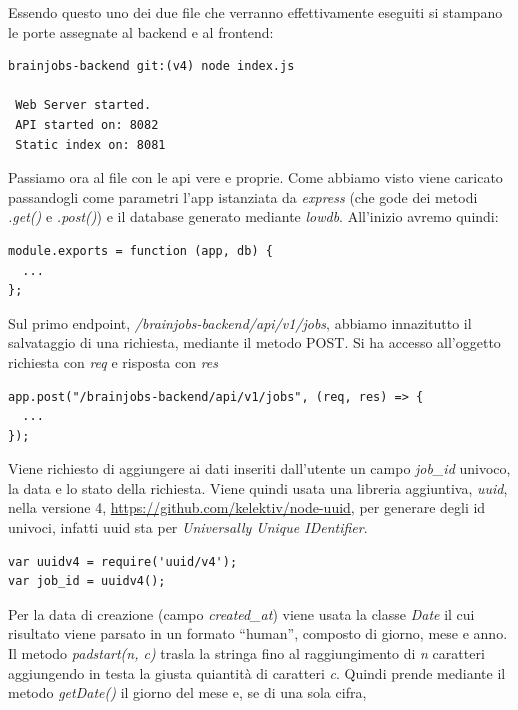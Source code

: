 \documentclass[a4paper,12pt, oneside]{book}
\begin{document}
\newpage
Essendo questo uno dei due file che verranno effettivamente eseguiti si stampano le porte assegnate al backend e al frontend:
\begin{shaded}
\begin{verbatim}
brainjobs-backend git:(v4) node index.js

 Web Server started.
 API started on: 8082
 Static index on: 8081
\end{verbatim}
\end{shaded}
Passiamo ora al file con le api vere e proprie. Come abbiamo visto viene caricato
passandogli come parametri l'app istanziata da \textit{express} (che gode dei metodi \textit{.get()} e \textit{.post()}) e il database generato mediante \textit{lowdb}. All'inizio avremo quindi:
\begin{shaded}
\begin{verbatim}
module.exports = function (app, db) {
  ...
};
\end{verbatim}
\end{shaded}
Sul primo endpoint, \textit{/brainjobs-backend/api/v1/jobs}, abbiamo innazitutto il salvataggio
di una richiesta, mediante il metodo POST. Si ha accesso all'oggetto richiesta con \textit{req} e risposta con \textit{res}
\begin{shaded}
\begin{verbatim}
app.post("/brainjobs-backend/api/v1/jobs", (req, res) => { 
  ...
});
\end{verbatim}
\end{shaded}
Viene richiesto di aggiungere ai dati inseriti dall'utente un campo \textit{job\_id} univoco, la data e lo stato della richiesta.
Viene quindi usata una libreria aggiuntiva, \textit{uuid}, nella versione 4, \url{https://github.com/kelektiv/node-uuid}, per generare degli id univoci, infatti uuid sta per \textit{Universally Unique IDentifier}.
\begin{shaded}
\begin{verbatim}
var uuidv4 = require('uuid/v4');
var job_id = uuidv4();
\end{verbatim}
\end{shaded}
Per la data di creazione (campo \textit{created\_at}) viene usata la classe \textit{Date} il cui risultato viene parsato in un formato ``human'', composto di giorno, mese e anno.
Il metodo \textit{padstart(n, c)} trasla la stringa fino al raggiungimento di \textit{n}
caratteri aggiungendo in testa la giusta quiantità di caratteri \textit{c}. Quindi prende
mediante il metodo \textit{getDate()} il giorno del mese e, se di una sola cifra,
\end{document}
